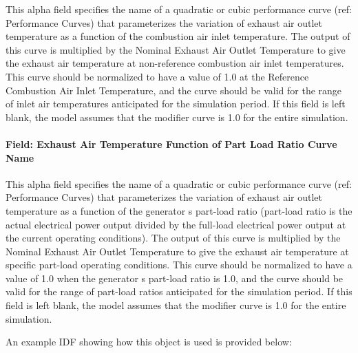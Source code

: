 This alpha field specifies the name of a quadratic or cubic performance curve (ref: Performance Curves) that parameterizes the variation of exhaust air outlet temperature as a function of the combustion air inlet temperature. The output of this curve is multiplied by the Nominal Exhaust Air Outlet Temperature to give the exhaust air temperature at non-reference combustion air inlet temperatures. This curve should be normalized to have a value of 1.0 at the Reference Combustion Air Inlet Temperature, and the curve should be valid for the range of inlet air temperatures anticipated for the simulation period. If this field is left blank, the model assumes that the modifier curve is 1.0 for the entire simulation.

\paragraph{Field: Exhaust Air Temperature Function of Part Load Ratio Curve Name}\label{field-exhaust-air-temperature-function-of-part-load-ratio-curve-name}

This alpha field specifies the name of a quadratic or cubic performance curve (ref: Performance Curves) that parameterizes the variation of exhaust air outlet temperature as a function of the generator s part-load ratio (part-load ratio is the actual electrical power output divided by the full-load electrical power output at the current operating conditions). The output of this curve is multiplied by the Nominal Exhaust Air Outlet Temperature to give the exhaust air temperature at specific part-load operating conditions. This curve should be normalized to have a value of 1.0 when the generator s part-load ratio is 1.0, and the curve should be valid for the range of part-load ratios anticipated for the simulation period. If this field is left blank, the model assumes that the modifier curve is 1.0 for the entire simulation.

An example IDF showing how this object is used is provided below:

